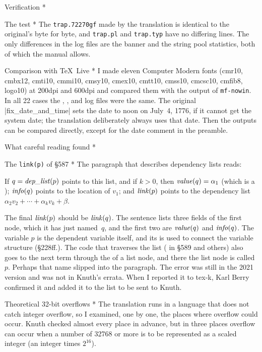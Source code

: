 {\quad Verification *

\subhead * The  test *
The {\tt trap.72270gf} made by the translation is identical to the
original's byte for byte, and {\tt trap.pl} and {\tt trap.typ} have no
differing lines. The only differences in the log files are the banner
and the string pool statistics, both of which the  manual
allows.

\subhead * Comparison with \TeX\ Live *
I made eleven Computer Modern fonts (cmr10, cmbx12, cmti10, cmmi10,
cmsy10, cmex10, cmtt10, cmss10, cmcsc10, cmfib8, logo10) at
200\thinspace dpi and 600\thinspace dpi and compared them with the
output of {\tt mf-nowin}. In all 22 cases the \TFM, , and log
files were the same. The original |fix_date_and_time| sets the date to
noon on July~4, 1776, if it cannot get the system date; the translation
deliberately always uses that date. Then the outputs can be compared
directly, except for the date comment in the  preamble.

\quad What careful reading found *

\subhead * The {\tt link(p)} of {\rm\S587} *
The paragraph that describes dependency lists reads:

{\narrower\smallskip\noindent
If $q=\hbox{\it dep\_list\/}(p)$ points to this list, and if $k>0$, then
$\hbox{\it value\/}(q)=\alpha_1$ (which is a ); $\hbox{\it info\/}(q)$
points to the location of $v_1$; and $\hbox{\it link\/}(p)$ points to the
dependency list $\alpha_2v_2+\cdots+\alpha_kv_k+\beta$.
\smallskip\par}

The final $\hbox{\it link\/}(p)$ should be $\hbox{\it link\/}(q)$. The sentence lists
three fields of the first node, which it has just named~$q$, and the
first two are $\hbox{\it value\/}(q)$ and $\hbox{\it info\/}(q)$. The variable $p$ is
the dependent variable itself, and its  is used to connect the
variable structure (\S228ff.). The code that traverses the list
( in \S589 and others) also goes to the next term
through the  of a list node, and there the list node is called
$p$. Perhaps that name slipped into the paragraph. The error was still
in the 2021 version and was not in Knuth's errata. When I reported it
to tex-k, Karl Berry confirmed it and added it to the list to be sent
to Knuth.

\subhead * Theoretical 32-bit overflows *
The translation runs in a language that does not catch integer
overflow, so I examined, one by one, the places where overflow could
occur. Knuth checked almost every place in advance, but in three places
overflow can occur when a number of 32768 or more is to be represented
as a scaled integer (an integer times $2^{16}$).

}
